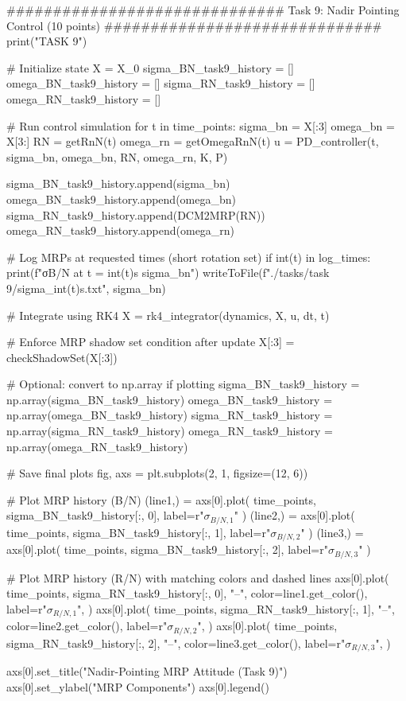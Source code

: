 \documentclass[conf]{new-aiaa}
\begin{document}
\begin{pythoncode}
############################## Task 9: Nadir Pointing Control (10 points) ##############################
print("\n\nBEGIN TASK 9")

# Initialize state
X = X_0
sigma_BN_task9_history = []
omega_BN_task9_history = []
sigma_RN_task9_history = []
omega_RN_task9_history = []

# Run control simulation
for t in time_points:
    sigma_bn = X[:3]
    omega_bn = X[3:]
    RN = getRnN(t)
    omega_rn = getOmegaRnN(t)
    u = PD_controller(t, sigma_bn, omega_bn, RN, omega_rn, K, P)

    sigma_BN_task9_history.append(sigma_bn)
    omega_BN_task9_history.append(omega_bn)
    sigma_RN_task9_history.append(DCM2MRP(RN))
    omega_RN_task9_history.append(omega_rn)

    # Log MRPs at requested times (short rotation set)
    if int(t) in log_times:
        print(f"σB/N at t = {int(t)}s {sigma_bn}")
        writeToFile(f"./tasks/task 9/sigma_{int(t)}s.txt", sigma_bn)

    # Integrate using RK4
    X = rk4_integrator(dynamics, X, u, dt, t)

    # Enforce MRP shadow set condition after update
    X[:3] = checkShadowSet(X[:3])

# Optional: convert to np.array if plotting
sigma_BN_task9_history = np.array(sigma_BN_task9_history)
omega_BN_task9_history = np.array(omega_BN_task9_history)
sigma_RN_task9_history = np.array(sigma_RN_task9_history)
omega_RN_task9_history = np.array(omega_RN_task9_history)

# Save final plots
fig, axs = plt.subplots(2, 1, figsize=(12, 6))

# Plot MRP history (B/N)
(line1,) = axs[0].plot(
    time_points, sigma_BN_task9_history[:, 0], label=r"$\sigma_{B/N,1}$"
)
(line2,) = axs[0].plot(
    time_points, sigma_BN_task9_history[:, 1], label=r"$\sigma_{B/N,2}$"
)
(line3,) = axs[0].plot(
    time_points, sigma_BN_task9_history[:, 2], label=r"$\sigma_{B/N,3}$"
)

# Plot MRP history (R/N) with matching colors and dashed lines
axs[0].plot(
    time_points,
    sigma_RN_task9_history[:, 0],
    "--",
    color=line1.get_color(),
    label=r"$\sigma_{R/N,1}$",
)
axs[0].plot(
    time_points,
    sigma_RN_task9_history[:, 1],
    "--",
    color=line2.get_color(),
    label=r"$\sigma_{R/N,2}$",
)
axs[0].plot(
    time_points,
    sigma_RN_task9_history[:, 2],
    "--",
    color=line3.get_color(),
    label=r"$\sigma_{R/N,3}$",
)

axs[0].set_title("Nadir-Pointing MRP Attitude (Task 9)")
axs[0].set_ylabel("MRP Components")
axs[0].legend()


\end{pythoncode}
\end{document}
